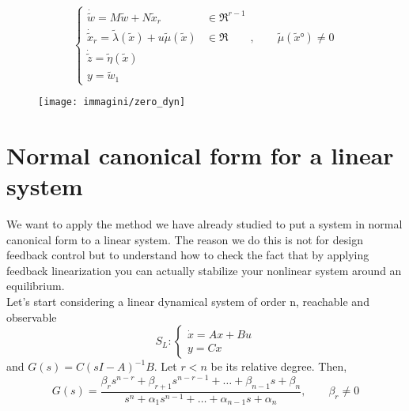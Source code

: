 \begin{equation*}
	\left\{
	\begin{array}{ll}	
		\dot{\tilde{w}}=M\tilde{w}+N\tilde{x}_r & \in \Re^{r-1}\\
		\dot{\tilde{x}}_r=\tilde{\lambda}(\tilde{x})+u\tilde{\mu}(\tilde{x}) & \in \Re \qquad,\qquad \tilde{\mu}(\tilde{x}°)\neq 0\\
		\dot{\tilde{z}}=\tilde{\eta}(\tilde{x})\\
		y=\tilde{w}_1 &
	\end{array}
	\right.	
\end{equation*}
\begin{figure}[H]
	\centering
	\texttt{[image: immagini/zero\_dyn]}
	\caption{}
	\label{fig:zerodyn}
\end{figure}
\section{Normal canonical form for a linear system} \label{canonical}
We want to apply the method we have already studied to put a system in normal canonical form to a linear  system. The reason we do this is not for design feedback control  but to  understand how to check the fact that by applying feedback linearization you can actually stabilize your nonlinear system around an equilibrium.\\Let's start considering a linear dynamical system of order n, reachable and observable
\[S_L\colon \begin{cases}
	\dot{x}=Ax+Bu\\
	y=Cx
\end{cases}
\] and $G(s)=C(sI-A)^{-1}B$. Let $r<n$ be its relative degree. Then,\[
G(s)=\frac{\beta_rs^{n-r}+\beta_{r+1}s^{n-r-1}+\dots+\beta_{n-1}s+\beta_n}{s^n+\alpha_1s^{n-1}+\dots+\alpha_{n-1}s+\alpha_n}, \qquad \beta_r\neq0
\]

